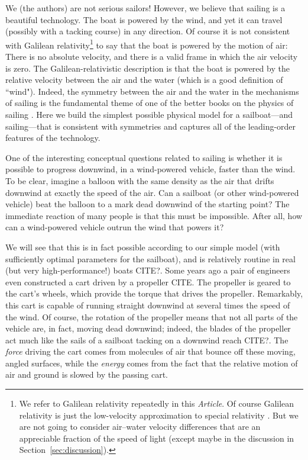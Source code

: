 \documentclass[letterpaper]{article}
\newcommand{\documentname}{\textsl{Article}}
\newcommand{\secref}[1]{Section~\ref{#1}}
\begin{document}
We (the authors) are not serious sailors!
However, we believe that sailing is a beautiful technology.
The boat is powered by the wind, and yet it can travel (possibly with a tacking course) in any direction.
Of course it is not consistent with Galilean relativity\footnote{We refer to Galilean relativity repeatedly in this \documentname.
Of course Galilean relativity is just the low-velocity approximation to special relativity \cite{sr}.
But we are not going to consider air--water velocity differences that are an appreciable fraction of the speed of light (except maybe in the discussion in \secref{sec:discussion}).} to say that the boat is powered by the motion of air:
There is no absolute velocity, and there is a valid  frame in which the air velocity is zero.
The Galilean-relativistic description is that the boat is powered by the relative velocity between the air and the water (which is a good definition of ``wind").
Indeed, the symmetry between the air and the water in the mechanisms of sailing is the fundamental theme of one of the better books on the physics of sailing \cite{symmetry}.
Here we build the simplest possible physical model for a sailboat---and sailing---that is consistent with symmetries and captures all of the leading-order features of the technology.

One of the interesting conceptual questions related to sailing is whether it is possible to progress downwind, in a wind-powered vehicle, faster than the wind.  To be clear, imagine a balloon with the same density as the air that drifts downwind at exactly the speed of the air.  Can a sailboat (or other wind-powered vehicle) beat the balloon to a mark dead downwind of the starting point?  The immediate reaction of many people is that this must be impossible.  After all, how can a wind-powered vehicle outrun the wind that powers it?  

We will see that this is in fact possible according to our simple model (with sufficiently optimal parameters for the sailboat), and  is relatively routine in real (but very high-performance!) boats CITE?.
Some years ago a pair of engineers even constructed a cart driven by a propeller CITE.
The propeller is geared to the cart's wheels, which provide the torque that drives the propeller.
Remarkably, this cart is capable of running straight downwind at several times the speed of the wind.  Of course, the rotation of the propeller means that not all parts of the vehicle are, in fact, moving dead downwind; indeed, the blades of the propeller act much like the sails of a sailboat tacking on a downwind reach CITE?.  The \emph{force} driving the cart comes from molecules of air that bounce off these moving, angled surfaces, while the \emph{energy} comes from the fact that the relative motion of air and ground is slowed by the passing cart.
\end{document}
